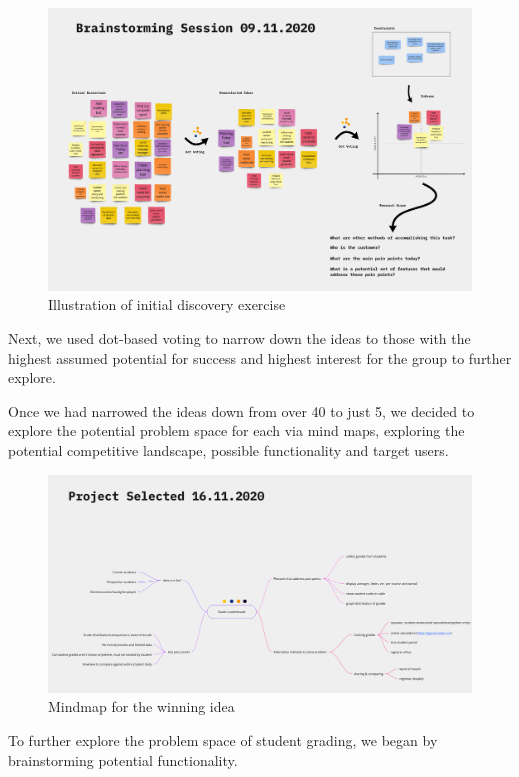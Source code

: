 \begin{figure}[H]
    \centering
    \includegraphics[width=\textwidth]{images/brainstorm.png}
    \caption{Illustration of initial discovery exercise}
    \label{fig:brainstorm}
\end{figure}

Next, we used dot-based voting to narrow down the ideas to those with the highest assumed potential for success and highest interest for the group to further explore. 

Once we had narrowed the ideas down from over 40 to just 5, we decided to explore the potential problem space for each via mind maps, exploring the potential competitive landscape, possible functionality and target users.

\begin{figure}[H]
    \centering
\includegraphics[width=\textwidth]{images/mindmap.png}
    \caption{Mindmap for the winning idea}
    \label{fig:mindmap}
\end{figure}

To further explore the problem space of student grading, we began by brainstorming potential functionality. 

